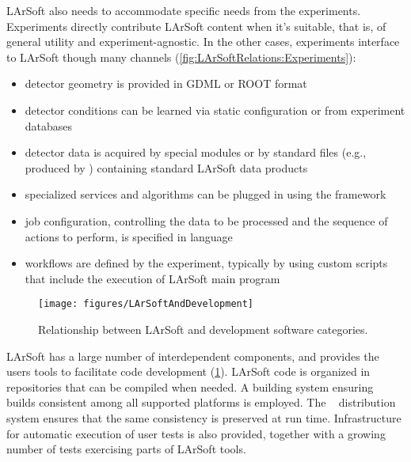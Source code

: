 LArSoft also needs to accommodate specific needs from the experiments.
Experiments directly contribute LArSoft content when it's suitable, that is,
of general utility and experiment-agnostic.
In the other cases, experiments interface to LArSoft though many channels
(\cref{fig:LArSoftRelations:Experiments}):
\begin{itemize}
	\item detector geometry is provided in GDML or ROOT format
	\item detector conditions can be learned via static configuration or from experiment databases
	\item detector data is acquired by special \ART modules or by standard \ART files (e.g., produced by \ARTDAQ) containing standard LArSoft data products
	\item specialized services and algorithms can be plugged in using the \ART framework
	\item job configuration, controlling the data to be processed and the sequence of actions to perform,
		is specified in \FHiCL language
	\item workflows are defined by the experiment, typically by using custom scripts that include the execution of LArSoft main program
\end{itemize}
\begin{figure}
	\centering\texttt{[image: figures/LArSoftAndDevelopment]}
	\caption{\label{fig:LArSoftRelations:Development}
		Relationship between LArSoft and development software categories.
	}
\end{figure}

LArSoft has a large number of interdependent components,
and provides the users tools to facilitate code development (\cref{fig:LArSoftRelations:Development}).
LArSoft code is organized in repositories that can be compiled when needed.
A building system ensuring builds consistent among all supported platforms is employed.
The \UPS~\cite{UPS} distribution system ensures that the same consistency is preserved at run time.
Infrastructure for automatic execution of user tests is also provided,
together with a growing number of tests exercising parts of LArSoft tools.



